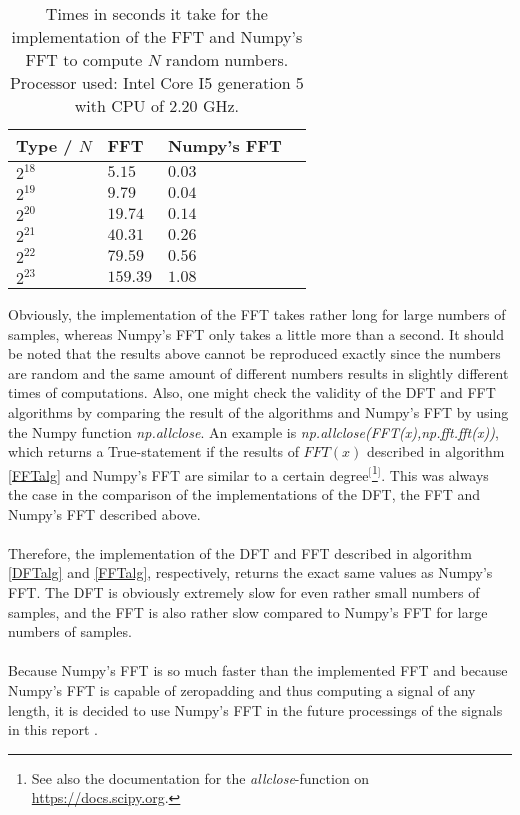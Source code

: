 \begin{table}[H]
\centering
\begin{tabular}{|l|l|l|l|}
\hline
Type / $N$ & FFT	   & Numpy's FFT \\ \hline
$2^{18}$   & $5.15$    & $0.03$ \\ \hline
$2^{19}$   & $9.79$    & $0.04$ \\ \hline
$2^{20}$   & $19.74$   & $0.14$ \\ \hline
$2^{21}$   & $40.31$   & $0.26$ \\ \hline
$2^{22}$   & $79.59$   & $0.56$ \\ \hline
$2^{23}$   & $159.39$  & $1.08$ \\ \hline
\end{tabular}
\caption{Times in seconds it take for the implementation of the FFT and Numpy's FFT to compute $N$ random numbers. Processor used: Intel Core I5 generation 5 with CPU of 2.20 GHz.}
\label{tab:FT2compare}
\end{table}

Obviously, the implementation of the FFT takes rather long for large numbers of samples, whereas Numpy's FFT only takes a little more than a second. It should be noted that the results above cannot be reproduced exactly since the numbers are random and the same amount of different numbers results in slightly different times of computations. Also, one might check the validity of the DFT and FFT algorithms by comparing the result of the algorithms and Numpy's FFT by using the Numpy function \textit{np.allclose}. An example is \textit{np.allclose(FFT(x),np.fft.fft(x))}, which returns a True-statement if the results of $FFT(x)$ described in algorithm \ref{FFTalg} and Numpy's FFT are similar to a certain degree$^[$\footnote{See also the documentation for the \textit{allclose}-function on \href{https://docs.scipy.org/doc/numpy/reference/generated/numpy.allclose.html}{https://docs.scipy.org}.}$^]$. This was always the case in the comparison of the implementations of the DFT, the FFT and Numpy's FFT described above.
\\ \\
Therefore, the implementation of the DFT and FFT described in algorithm \ref{DFTalg} and \ref{FFTalg}, respectively, returns the exact same values as Numpy's FFT. The DFT is obviously extremely slow for even rather small numbers of samples, and the FFT is also rather slow compared to Numpy's FFT for large numbers of samples.
\\ \\
Because Numpy's FFT is so much faster than the implemented FFT and because Numpy's FFT is capable of zeropadding and thus computing a signal of any length, it is decided to use Numpy's FFT in the future processings of the signals in this report .